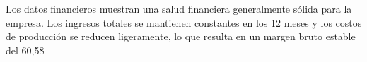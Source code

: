

Los datos financieros muestran una salud financiera generalmente sólida para la empresa. Los ingresos totales se mantienen constantes en los 12 meses y los costos de producción se reducen ligeramente, lo que resulta en un margen bruto estable del 60,58%